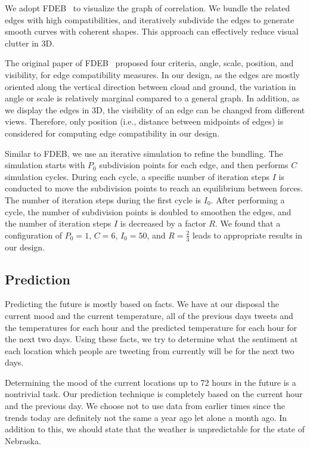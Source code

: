\documentclass[journal]{vgtc}                %
\begin{document}
We adopt FDEB~\cite{holten2009force} to visualize the graph of correlation. We bundle the related edges with high compatibilities, and iteratively subdivide the edges to generate smooth curves with coherent shapes. This approach can effectively reduce visual clutter in 3D.

The original paper of FDEB~\cite{holten2009force} proposed four criteria, angle, scale, position, and visibility, for edge compatibility measures. In our design, as the edges are mostly oriented along the vertical direction between cloud and ground, the variation in angle or scale is relatively marginal compared to a general graph. In addition, as we display the edges in 3D, the visibility of an edge can be changed from different views. Therefore, only position (i.e., distance between midpoints of edges) is considered for computing edge compatibility in our design.

Similar to FDEB, we use an iterative simulation to refine the bundling. The simulation starts with $P_0$ subdivision points for each edge, and then performs $C$ simulation cycles. During each cycle, a specific number of iteration steps $I$ is conducted to move the subdivision points to reach an equilibrium between forces. The number of iteration steps during the first cycle is $I_0$. After performing a cycle, the number of subdivision points is doubled to smoothen the edges, and the number of iteration steps $I$ is decreased by a factor $R$. We found that a configuration of $P_0=1$, $C=6$, $I_0=50$, and $R=\frac{2}{3}$ leads to appropriate results in our design. 


\subsection{Prediction}
\label{sec:pred}

Predicting the future is mostly based on facts. We have at our disposal the current mood and the current temperature, all of the previous days tweets and the temperatures for each hour and the predicted temperature for each hour for the next two days. Using these facts, we try to determine what the sentiment at each location which people are tweeting from currently will be for the next two days. 

Determining the mood of the current locations up to 72 hours in the future is a nontrivial task. Our prediction technique is completely based on the current hour and the previous day. We choose not to use data from earlier times since the trends today are definitely not the same a year ago let alone a month ago. In addition to this, we should state that the weather is unpredictable for the state of Nebraska.
\end{document}
